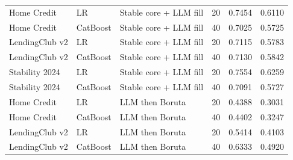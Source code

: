\documentclass[final,5p,twocolumn]{elsarticle}
\begin{document}
\begin{table}[htbp]
\begin{threeparttable}
\begin{tabular}{@{}lllcrr@{}}
Home Credit & LR & Stable core + LLM fill & 20 & 0.7454 & 0.6110 \\
Home Credit & CatBoost & Stable core + LLM fill & 40 & 0.7025 & 0.5725 \\
LendingClub v2 & LR & Stable core + LLM fill & 20 & 0.7115 & 0.5783 \\
LendingClub v2 & CatBoost & Stable core + LLM fill & 40 & 0.7130 & 0.5842 \\
Stability 2024 & LR & Stable core + LLM fill & 20 & 0.7554 & 0.6259 \\
Stability 2024 & CatBoost & Stable core + LLM fill & 40 & 0.7091 & 0.5727 \\
Home Credit & LR & LLM then Boruta & 20 & 0.4388 & 0.3031 \\
Home Credit & CatBoost & LLM then Boruta & 40 & 0.4402 & 0.3247 \\
LendingClub v2 & LR & LLM then Boruta & 20 & 0.5414 & 0.4103 \\
LendingClub v2 & CatBoost & LLM then Boruta & 40 & 0.6333 & 0.4920 \\
\bottomrule
\end{tabular}
\end{threeparttable}
\end{table}
\end{document}
